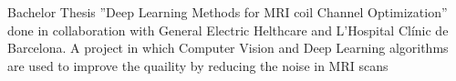 \begin{tcolorbox}
\begin{minipage}[t]{0.7\textwidth}
\begin{tcolorbox}[grow to right by=0.75cm,height=0.8\textheight,colframe=white,colback=white]
{                Bachelor Thesis ''Deep Learning Methods for MRI coil Channel Optimization'' done in collaboration with 
                General Electric Helthcare and L'Hospital Clínic de Barcelona.
                A project in which Computer Vision and Deep Learning algorithms are used
                to improve the quaility by reducing the noise in MRI scans\\
            }
        \end{tcolorbox}
    \end{minipage}
\end{tcolorbox}

